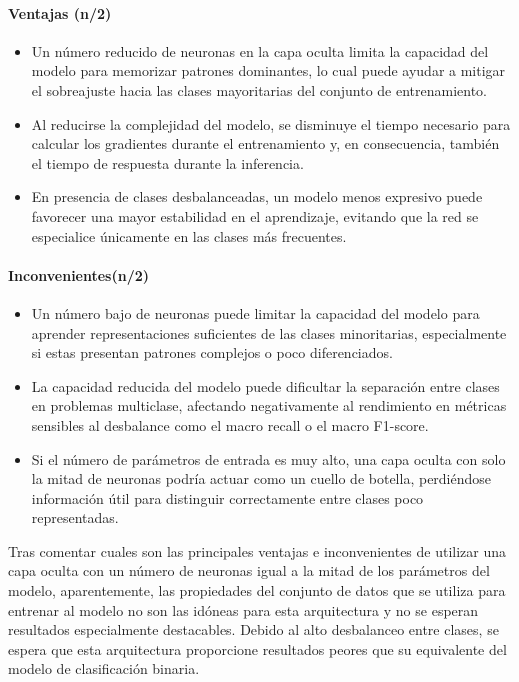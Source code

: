 \paragraph{Ventajas (n/2)}
\begin{itemize}
	\item Un número reducido de neuronas en la capa oculta limita la capacidad del modelo para memorizar patrones dominantes, lo cual puede ayudar a mitigar el sobreajuste hacia las clases mayoritarias del conjunto de entrenamiento.
	\item Al reducirse la complejidad del modelo, se disminuye el tiempo necesario para calcular los gradientes durante el entrenamiento y, en consecuencia, también el tiempo de respuesta durante la inferencia.
	\item En presencia de clases desbalanceadas, un modelo menos expresivo puede favorecer una mayor estabilidad en el aprendizaje, evitando que la red se especialice únicamente en las clases más frecuentes.

\end{itemize}
\paragraph{Inconvenientes(n/2)}
\begin{itemize}
	\item Un número bajo de neuronas puede limitar la capacidad del modelo para aprender representaciones suficientes de las clases minoritarias, especialmente si estas presentan patrones complejos o poco diferenciados.
	\item La capacidad reducida del modelo puede dificultar la separación entre clases en problemas multiclase, afectando negativamente al rendimiento en métricas sensibles al desbalance como el macro recall o el macro F1-score.
	\item Si el número de parámetros de entrada es muy alto, una capa oculta con solo la mitad de neuronas podría actuar como un cuello de botella, perdiéndose información útil para distinguir correctamente entre clases poco representadas.

\end{itemize}

Tras comentar cuales son las principales ventajas e inconvenientes de utilizar una capa oculta con un número de neuronas igual a la mitad de los parámetros del modelo, aparentemente, las propiedades del conjunto de datos que se utiliza para entrenar al modelo no son las idóneas para esta arquitectura y no se esperan resultados especialmente destacables. Debido al alto desbalanceo entre clases, se espera que esta arquitectura proporcione resultados peores que su equivalente del modelo de clasificación binaria.

